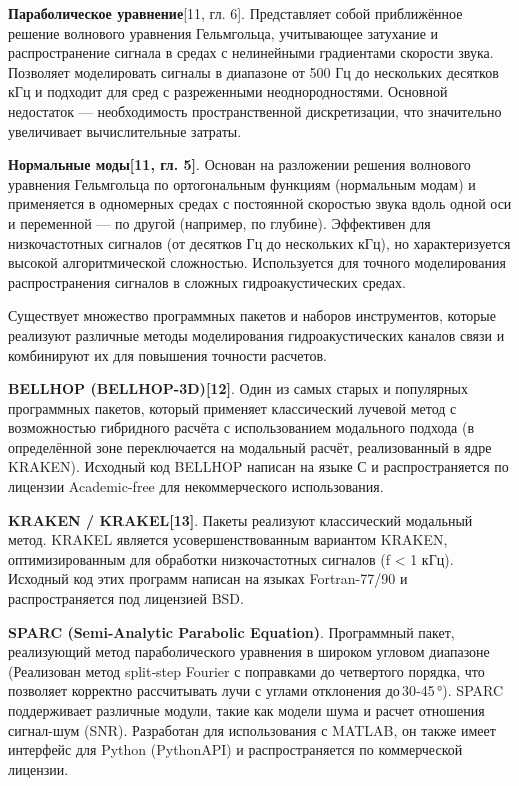 \textbf{Параболическое уравнение}{[}11, гл. 6{]}. Представляет собой
приближённое решение волнового уравнения Гельмгольца, учитывающее
затухание и распространение сигнала в средах с нелинейными градиентами
скорости звука. Позволяет моделировать сигналы в диапазоне от 500 Гц до
нескольких десятков кГц и подходит для сред с разреженными
неоднородностями. Основной недостаток --- необходимость пространственной
дискретизации, что значительно увеличивает вычислительные затраты.

\textbf{Нормальные моды{[}11, гл. 5{]}}. Основан на разложении решения
волнового уравнения Гельмгольца по ортогональным функциям (нормальным
модам) и применяется в одномерных средах с постоянной скоростью звука
вдоль одной оси и переменной --- по другой (например, по глубине).
Эффективен для низкочастотных сигналов (от десятков Гц до нескольких
кГц), но характеризуется высокой алгоритмической сложностью.
Используется для точного моделирования распространения сигналов в
сложных гидроакустических средах.

Существует множество программных пакетов и наборов инструментов, которые
реализуют различные методы моделирования гидроакустических каналов связи
и комбинируют их для повышения точности расчетов.

\textbf{BELLHOP (BELLHOP-3D){[}12{]}}. Один из самых старых и популярных
программных пакетов, который применяет классический лучевой метод с
возможностью гибридного расчёта с использованием модального подхода (в
определённой зоне переключается на модальный расчёт, реализованный в
ядре KRAKEN). Исходный код BELLHOP написан на языке С и распространяется
по лицензии Academic-free для некоммерческого использования.

\textbf{KRAKEN / KRAKEL{[}13{]}}. Пакеты реализуют классический
модальный метод. KRAKEL является усовершенствованным вариантом KRAKEN,
оптимизированным для обработки низкочастотных сигналов (f \textless{} 1
кГц). Исходный код этих программ написан на языках Fortran-77/90 и
распространяется под лицензией BSD.

\textbf{SPARC (Semi‑Analytic Parabolic Equation)}. Программный пакет,
реализующий метод параболического уравнения в широком угловом диапазоне
(Реализован метод split‑step Fourier с поправками до четвертого порядка,
что позволяет корректно рассчитывать лучи с углами отклонения
до\,30‑45\,°). SPARC поддерживает различные модули, такие как модели
шума и расчет отношения сигнал-шум (SNR). Разработан для использования с
MATLAB, он также имеет интерфейс для Python (PythonAPI) и
распространяется по коммерческой лицензии.

